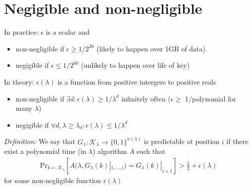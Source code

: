 \documentclass{article}
\begin{document}
\section{Negigible and non-negligible}

In practice: $\epsilon$ is a scalar and 
\begin{itemize}
\item non-negligible if $\epsilon \ge 1 / 2^{30}$ (likely to happen over 1GB of
data).
\item negigible if $\epsilon \le 1 / 2^{80}$ (unlikely to happen over life of 
key)
\end{itemize}

In theory: $\epsilon(\lambda)$ is a function from positive intergers to 
positive reals
\begin{itemize}
\item non-negligible if $\exists d: \epsilon(\lambda) \ge 1 / \lambda^d$ 
infinitely often ($\epsilon \ge $ 1/polynomial for many $\lambda$)
\item negigible if $\forall d, \lambda \ge \lambda_d: \epsilon(\lambda) \le
1/\lambda^d$
\end{itemize}

\emph{Definition:} We say that $G_\lambda: \mathcal{K}_\lambda \to \lbrace 0,1 
\rbrace^{n(\lambda)}$ is predictable at position $i$  if there exist a polynomial
time (in $\lambda$) algorithm $A$ such that 
\begin{eqnarray}
\text{Pr}_{k \leftarrow \mathcal{K}_\lambda} \left[ A(\lambda, G_\lambda(k)|_{1, \ldots,
i}) =  G_\lambda(k)|_{i+1} \right] > \frac{1}{2} + \epsilon(\lambda)
\end{eqnarray}
for some non-negligible function $\epsilon(\lambda)$
\end{document}

